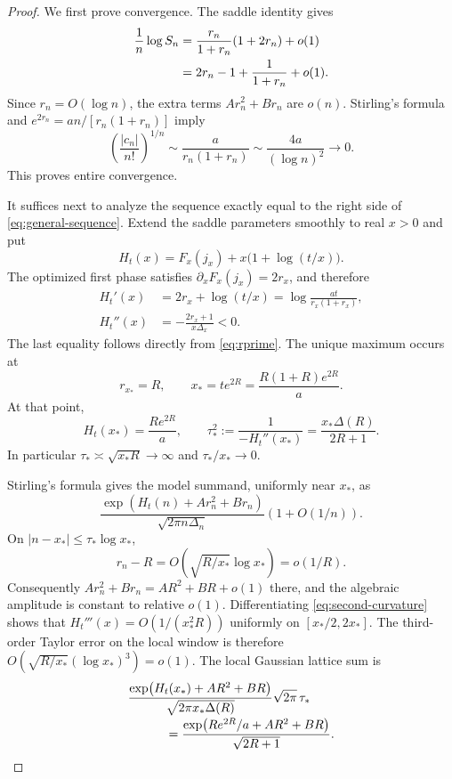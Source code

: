 \documentclass[11pt,a4paper]{article}
\numberwithin{equation}{section}
\theoremstyle{definition}
\theoremstyle{remark}
\begin{document}
\begin{proof}
We first prove convergence. The saddle identity gives
\begin{align}
 \frac1n\log S_n
 &=\frac{r_n}{1+r_n}(1+2r_n)+o(1)\notag\\
 &=2r_n-1+\frac1{1+r_n}+o(1).
 \label{eq:root-S}
\end{align}
Since $r_n=O(\log n)$, the extra terms $A r_n^2+B r_n$ are $o(n)$.
Stirling's formula and $e^{2r_n}=an/[r_n(1+r_n)]$ imply
\begin{equation}
 \left(\frac{|c_n|}{n!}\right)^{1/n}
 \sim\frac{a}{r_n(1+r_n)}
 \sim\frac{4a}{(\log n)^2}\longrightarrow0.
 \label{eq:borel-root}
\end{equation}
This proves entire convergence.

It suffices next to analyze the sequence exactly equal to the right side
of \eqref{eq:general-sequence}. Extend the saddle parameters smoothly to
real $x>0$ and put
\begin{equation}
 H_t(x)=F_x(j_x)+x\bigl(1+\log(t/x)\bigr).
 \label{eq:second-phase}
\end{equation}
The optimized first phase satisfies
$\partial_xF_x(j_x)=2r_x$, and therefore
\begin{align}
 H_t'(x)&=2r_x+\log(t/x)
       =\log\frac{at}{r_x(1+r_x)},\label{eq:second-derivative}\\
 H_t''(x)&=-\frac{2r_x+1}{x\Delta_x}<0.
 \label{eq:second-curvature}
\end{align}
The last equality follows directly from \eqref{eq:rprime}. The unique
maximum occurs at
\begin{equation}
 r_{x_*}=R,\qquad x_*=t e^{2R}
              =\frac{R(1+R)e^{2R}}a.
 \label{eq:second-saddle}
\end{equation}
At that point,
\begin{equation}
 H_t(x_*)=\frac{R e^{2R}}a,
 \qquad \tau_*^2:=\frac1{-H_t''(x_*)}
           =\frac{x_*\Delta(R)}{2R+1}.
 \label{eq:second-value}
\end{equation}
In particular $\tau_*\asymp\sqrt{x_*R}\to\infty$ and
$\tau_*/x_*\to0$.

Stirling's formula gives the model summand, uniformly near $x_*$, as
\begin{equation}
 \frac{\exp\!\left(H_t(n)+A r_n^2+B r_n\right)}
      {\sqrt{2\pi n\Delta_n}}(1+O(1/n)).
 \label{eq:Borel-summand}
\end{equation}
On $|n-x_*|\le\tau_*\log x_*$,
\[
 r_n-R=O\!\left(\sqrt{R/x_*}\log x_*\right)=o(1/R).
\]
Consequently $A r_n^2+B r_n=A R^2+B R+o(1)$ there, and the algebraic
amplitude is constant to relative $o(1)$. Differentiating
\eqref{eq:second-curvature} shows that
$H_t'''(x)=O(1/(x_*^2R))$ uniformly on $[x_*/2,2x_*]$.
The third-order Taylor error on the local window is therefore
$O(\sqrt{R/x_*}(\log x_*)^3)=o(1)$. The local Gaussian lattice sum is
\begin{align}
 &\frac{\exp\!\left(H_t(x_*)+A R^2+B R\right)}
         {\sqrt{2\pi x_*\Delta(R)}}\sqrt{2\pi}\,\tau_*
 \notag\\[-2pt]
 &\hspace{3em}=
 \frac{\exp\!\left(R e^{2R}/a+A R^2+B R\right)}{\sqrt{2R+1}}.
 \label{eq:Borel-gaussian}
\end{align}


\end{proof}
\end{document}
